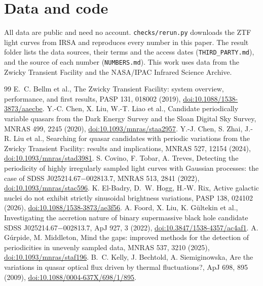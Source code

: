 \documentclass[11pt]{article}
\begin{document}
\section*{Data and code}
All data are public and need no account. \texttt{checks/rerun.py} downloads the ZTF light curves from IRSA and reproduces every number in this paper. The result folder lists the data sources, their terms and the access dates (\texttt{THIRD\_PARTY.md}), and the source of each number (\texttt{NUMBERS.md}). This work uses data from the Zwicky Transient Facility and the NASA/IPAC Infrared Science Archive.

\begin{thebibliography}{99}
 E.~C. Bellm et al., The Zwicky Transient Facility: system overview, performance, and first results, PASP 131, 018002 (2019), \href{https://doi.org/10.1088/1538-3873/aaecbe}{doi:10.1088/1538-3873/aaecbe}.
 Y.-C. Chen, X. Liu, W.-T. Liao et al., Candidate periodically variable quasars from the Dark Energy Survey and the Sloan Digital Sky Survey, MNRAS 499, 2245 (2020), \href{https://doi.org/10.1093/mnras/staa2957}{doi:10.1093/mnras/staa2957}.
 Y.-J. Chen, S. Zhai, J.-R. Liu et al., Searching for quasar candidates with periodic variations from the Zwicky Transient Facility: results and implications, MNRAS 527, 12154 (2024), \href{https://doi.org/10.1093/mnras/stad3981}{doi:10.1093/mnras/stad3981}.
 S. Covino, F. Tobar, A. Treves, Detecting the periodicity of highly irregularly sampled light curves with Gaussian processes: the case of SDSS J025214.67$-$002813.7, MNRAS 513, 2841 (2022), \href{https://doi.org/10.1093/mnras/stac596}{doi:10.1093/mnras/stac596}.
 K. El-Badry, D.~W. Hogg, H.-W. Rix, Active galactic nuclei do not exhibit strictly sinusoidal brightness variations, PASP 138, 024102 (2026), \href{https://doi.org/10.1088/1538-3873/ae3f56}{doi:10.1088/1538-3873/ae3f56}.
 A. Foord, X. Liu, K. G\"ultekin et al., Investigating the accretion nature of binary supermassive black hole candidate SDSS J025214.67$-$002813.7, ApJ 927, 3 (2022), \href{https://doi.org/10.3847/1538-4357/ac4af1}{doi:10.3847/1538-4357/ac4af1}.
 A. G\'urpide, M. Middleton, Mind the gaps: improved methods for the detection of periodicities in unevenly sampled data, MNRAS 537, 3210 (2025), \href{https://doi.org/10.1093/mnras/staf196}{doi:10.1093/mnras/staf196}.
 B.~C. Kelly, J. Bechtold, A. Siemiginowska, Are the variations in quasar optical flux driven by thermal fluctuations?, ApJ 698, 895 (2009), \href{https://doi.org/10.1088/0004-637X/698/1/895}{doi:10.1088/0004-637X/698/1/895}.

\end{thebibliography}
\end{document}

